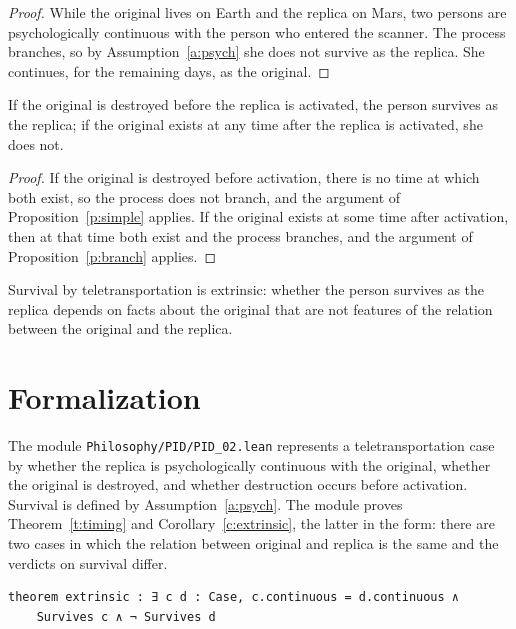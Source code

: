 \documentclass{situationist-preprint}
\begin{document}
\begin{proof}
While the original lives on Earth and the replica on Mars, two persons are psychologically continuous with the person who entered the scanner. The process branches, so by Assumption~\ref{a:psych} she does not survive as the replica. She continues, for the remaining days, as the original.
\end{proof}

\begin{theorem}\label{t:timing}
If the original is destroyed before the replica is activated, the person survives as the replica; if the original exists at any time after the replica is activated, she does not.
\end{theorem}

\begin{proof}
If the original is destroyed before activation, there is no time at which both exist, so the process does not branch, and the argument of Proposition~\ref{p:simple} applies. If the original exists at some time after activation, then at that time both exist and the process branches, and the argument of Proposition~\ref{p:branch} applies.
\end{proof}

\begin{corollary}\label{c:extrinsic}
Survival by teletransportation is extrinsic: whether the person survives as the replica depends on facts about the original that are not features of the relation between the original and the replica.
\end{corollary}

\section{Formalization}

The module \nolinkurl{Philosophy/PID/PID_02.lean} represents a teletransportation case by whether the replica is psychologically continuous with the original, whether the original is destroyed, and whether destruction occurs before activation. Survival is defined by Assumption~\ref{a:psych}. The module proves Theorem~\ref{t:timing} and Corollary~\ref{c:extrinsic}, the latter in the form: there are two cases in which the relation between original and replica is the same and the verdicts on survival differ.

\begin{lstlisting}
theorem extrinsic : ∃ c d : Case, c.continuous = d.continuous ∧
    Survives c ∧ ¬ Survives d
\end{lstlisting}
\end{document}

